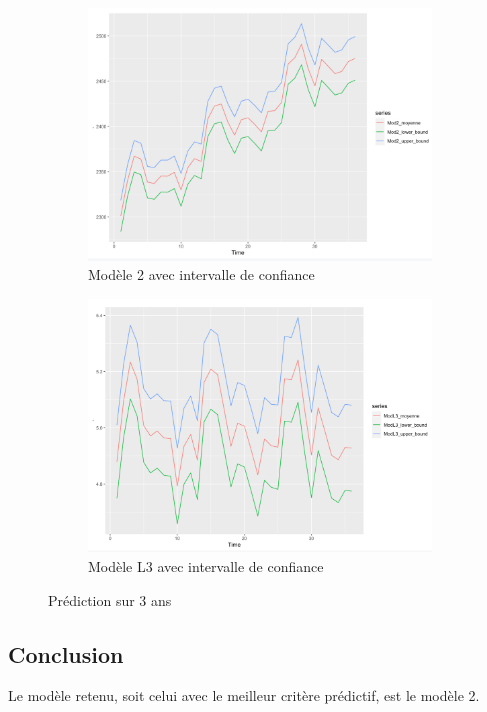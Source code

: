 \documentclass[12pt,a4paper]{book}
\newcommand{\1}{\mathds{1}}
\begin{document}
\begin{figure}[h]
	\begin{subfigure}{.5\textwidth}
  		\centering
    	\includegraphics[scale=0.4]{Mod2}  
    	\caption{Modèle 2 avec intervalle de confiance}
    	\label{fig:sub1}
    \end{subfigure}
    \begin{subfigure}{.5\textwidth}
    	\centering
    	\includegraphics[scale=0.4]{ModL3}  
    	\caption{Modèle L3 avec intervalle de confiance}
    	\label{fig:sub2}
    \end{subfigure}

\caption{Prédiction sur 3 ans}
\label{fig:1}
   
\end{figure}

\vspace{5 mm}
\subsection{Conclusion}

Le modèle retenu, soit celui avec le meilleur critère prédictif, est le modèle 2.
\end{document}
